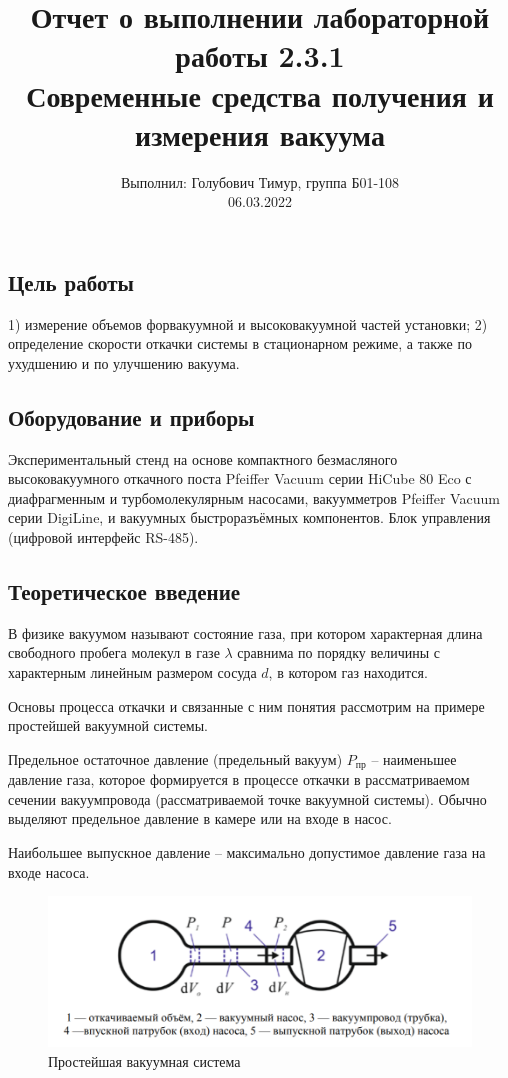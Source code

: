 \documentclass[12pt,a4paper]{article}
\author{\normalsize Выполнил: Голубович Тимур, группа Б01-108 \\
	\normalsize 06.03.2022}
\date{}
\title{
	\large Отчет о выполнении лабораторной работы 2.3.1 \\
	\Large Современные средства получения и измерения вакуума \\ 
	
}
\begin{document}
	\maketitle
	\subsection*{Цель работы} 
	  1) измерение объемов форвакуумной и высоковакуумной частей установки; 2) определение скорости откачки системы в стационарном режиме, а также по ухудшению и по улучшению вакуума. 
	
	\subsection*{Оборудование и приборы} Экспериментальный стенд на основе компактного безмасляного высоковакуумного откачного поста Pfeiffer Vacuum серии
	HiCube 80 Eco с диафрагменным и турбомолекулярным насосами, вакуумметров Pfeiffer Vacuum серии DigiLine, и вакуумных быстроразъёмных
	компонентов. Блок управления (цифровой интерфейс RS-485).
	
	
\subsection*{Теоретическое введение}

В физике вакуумом называют состояние газа, при котором характерная длина свободного пробега молекул в газе $\lambda$ сравнима по порядку
величины с характерным линейным размером сосуда $d$, в котором газ
находится.

Основы процесса откачки и связанные с ним понятия рассмотрим
на примере простейшей вакуумной системы.

Предельное остаточное давление (предельный вакуум) $P_{\text{пр}}$ -- наименьшее давление газа, которое формируется в процессе откачки в рассматриваемом сечении вакуумпровода (рассматриваемой точке вакуумной системы). Обычно выделяют предельное давление в
камере или на входе в насос.

Наибольшее выпускное давление -- максимально допустимое давление газа на входе насоса.

\begin{figure}[h]
	\centering
	\includegraphics[width = 11 cm]{res/1}
	\caption{Простейшая вакуумная система}
	\label{fig:vac}
\end{figure}
\end{document}

